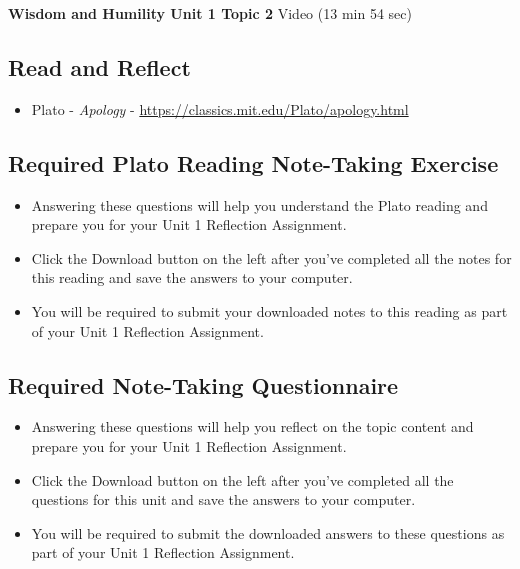 \documentclass[
]{book}
\providecommand{\tightlist}{%
  \setlength{\itemsep}{0pt}\setlength{\parskip}{0pt}}
\begin{document}
\textbf{Wisdom and Humility Unit 1 Topic 2} Video (13 min 54 sec)

\hypertarget{read-and-reflect-1}{%
\subsection*{Read and Reflect}\label{read-and-reflect-1}}

\begin{itemize}
\tightlist
\item
  Plato - \emph{Apology} - \url{https://classics.mit.edu/Plato/apology.html}
\end{itemize}

\hypertarget{required-plato-reading-note-taking-exercise}{%
\subsection*{Required Plato Reading Note-Taking Exercise}\label{required-plato-reading-note-taking-exercise}}

\begin{reflect}
\begin{itemize}
\tightlist
\item
  Answering these questions will help you understand the Plato reading and prepare you for your Unit 1 Reflection Assignment.
\item
  Click the Download button on the left after you've completed all the notes for this reading and save the answers to your computer.
\item
  You will be required to submit your downloaded notes to this reading as part of your Unit 1 Reflection Assignment.
\end{itemize}
\end{reflect}

\hypertarget{required-note-taking-questionnaire-1}{%
\subsection*{Required Note-Taking Questionnaire}\label{required-note-taking-questionnaire-1}}

\begin{reflect}
\begin{itemize}
\tightlist
\item
  Answering these questions will help you reflect on the topic content and prepare you for your Unit 1 Reflection Assignment.
\item
  Click the Download button on the left after you've completed all the questions for this unit and save the answers to your computer.
\item
  You will be required to submit the downloaded answers to these questions as part of your Unit 1 Reflection Assignment.
\end{itemize}
\end{reflect}
\end{document}
